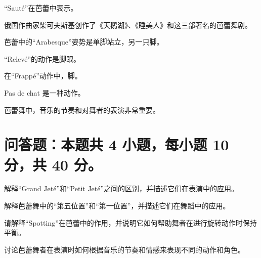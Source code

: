 \documentclass{exam-zh}
\begin{document}
    \begin{question}
    “Sauté”在芭蕾中表示\fillin[$2$]。
    \end{question}
    
    \begin{question}
    俄国作曲家柴可夫斯基创作了《天鹅湖》、《睡美人》和\fillin[$2$]这三部著名的芭蕾舞剧。
    \end{question}
    
    \begin{question}
    芭蕾中的“Arabesque”姿势是单脚站立，另一只脚\fillin[$2$]。
    \end{question}
    
    \begin{question}
    “Relevé”的动作是脚跟\fillin[$2$]。
    \end{question}
    
    \begin{question}
    在“Frappé”动作中，脚\fillin[$2$]。
    \end{question}
    
    \begin{question}
    Pas de chat 是一种\fillin[$2$]动作。
    \end{question}
    
    \begin{question}
    芭蕾舞中，音乐的节奏和\fillin[$2$]对舞者的表演非常重要。
    \end{question}

\section{问答题：本题共 4 小题，每小题 10 分，共 40 分。}


\begin{problem}[points = 10]
    解释“Grand Jeté”和“Petit Jeté”之间的区别，并描述它们在表演中的应用。
    \end{problem}
    
    \begin{problem}[points = 10]
    解释芭蕾舞中的“第五位置”和“第一位置”，并描述它们在舞蹈中的应用。
    \end{problem}

    \begin{problem}[points = 10]
        请解释“Spotting”在芭蕾中的作用，并说明它如何帮助舞者在进行旋转动作时保持平衡。
        \end{problem}
    
    \begin{problem}[points = 10]
    讨论芭蕾舞者在表演时如何根据音乐的节奏和情感来表现不同的动作和角色。
    \end{problem}
\end{document}

